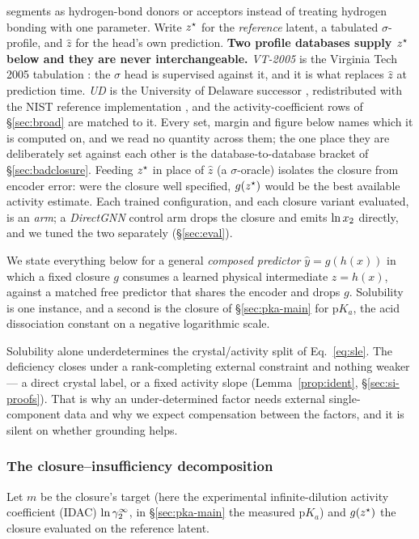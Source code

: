 segments as hydrogen-bond donors or acceptors instead of treating hydrogen bonding with one
parameter. Write $z^\star$ for the \emph{reference} latent, a tabulated $\sigma$-profile, and
$\hat z$ for the head's own prediction. \textbf{Two profile databases supply $z^\star$ below and they are never interchangeable.}
\emph{VT-2005} is the Virginia Tech 2005 tabulation \cite{mullins2006}: the $\sigma$ head is
supervised against it, and it is what replaces $\hat z$ at prediction time. \emph{UD} is the
University of Delaware successor \cite{fingerhut2017}, redistributed with the NIST reference
implementation \cite{bell2020cosmosac}, and the activity-coefficient rows of \S\ref{sec:broad} are
matched to it. Every set, margin and figure below names which it is computed on,
and we read no quantity across them; the one place they are deliberately set against each other is
the database-to-database bracket of \S\ref{sec:badclosure}. Feeding $z^\star$ in place of $\hat z$ (a
$\sigma$-oracle) isolates the closure from encoder error: were the closure well specified,
$g(z^\star)$ would be the best available activity estimate. Each trained configuration, and each
closure variant evaluated, is an \emph{arm}; a \emph{DirectGNN} control arm drops the closure and
emits $\ln x_2$ directly, and we tuned the two separately (\S\ref{sec:eval}).

We state everything below for a general \emph{composed predictor} $\hat y=g(h(x))$ in which a fixed
closure $g$ consumes a learned physical intermediate $z=h(x)$, against a matched free predictor that
shares the encoder and drops $g$. Solubility is one instance, and a second is the closure of \S\ref{sec:pka-main} for $\mathrm pK_a$,
the acid dissociation constant on a negative logarithmic scale.

Solubility alone underdetermines the crystal/activity split of Eq.~\eqref{eq:sle}. The deficiency closes under a rank-completing external constraint and nothing weaker --- a direct crystal label, or a fixed activity slope (Lemma~\ref{prop:ident}, \S\ref{sec:si-proofs}). That is why an under-determined factor needs external single-component data
and why we expect compensation between the factors, and it is silent on whether grounding helps.

\subsubsection{The closure--insufficiency decomposition}
\label{sec:decomp}
Let $m$ be the closure's target (here the experimental infinite-dilution activity coefficient
(IDAC) $\ln\gamma_2^\infty$, in \S\ref{sec:pka-main} the measured $\mathrm pK_a$) and $g(z^\star)$ the closure
evaluated on the reference latent.


